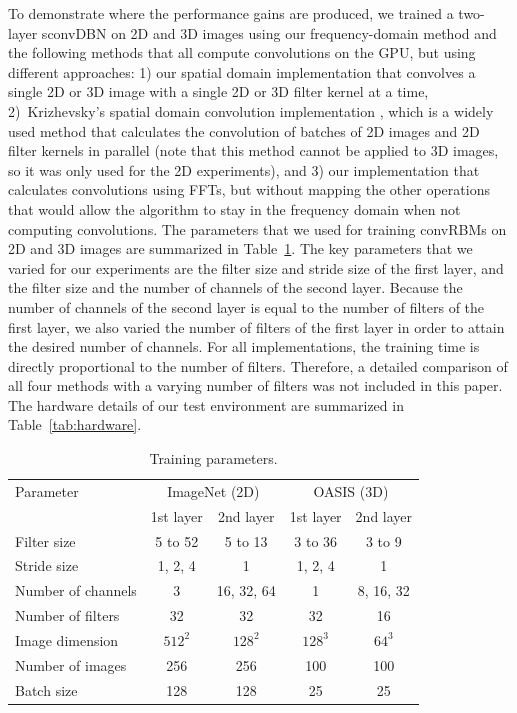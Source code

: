To demonstrate where the performance gains are produced, we trained a two-layer
sconvDBN on 2D and 3D images using our frequency-domain method and the following
methods that all compute convolutions on the GPU, but using different
approaches: 1) our spatial domain implementation that convolves a single 2D or
3D image with a single 2D or 3D filter kernel at a time, 2)~Krizhevsky's spatial
domain convolution implementation \citep{Krizhevsky2012b}, which is a widely
used method \citep[e.g.,][]{scherer2010,hinton2012,zeiler2013} that calculates
the convolution of batches of 2D images and 2D filter kernels in parallel (note
that this method cannot be applied to 3D images, so it was only used for the 2D
experiments), and 3) our implementation that calculates convolutions using FFTs,
but without mapping the other operations that would allow the algorithm to stay
in the frequency domain when not computing convolutions. The parameters that we
used for training convRBMs on 2D and 3D images are summarized in
Table~\ref{tab:parameters}. The key parameters that we varied for our
experiments are the filter size and stride size of the first layer, and the
filter size and the number of channels of the second layer.
Because the number of channels of the second layer is equal to the number of
filters of the first layer, we also varied the number of filters of the first
layer in order to attain the desired number of channels. For all
implementations, the training time is directly proportional to the number of
filters. Therefore, a detailed comparison of all four methods with a varying
number of filters was not included in this paper. The hardware details of our
test environment are summarized in Table~\ref{tab:hardware}.

\begin{table}
\centering
\caption{Training parameters.}\vspace{1em}
\begin{tabular}{lcccc}
\toprule
Parameter & \multicolumn{2}{c}{ImageNet (2D)} & \multicolumn{2}{c}{OASIS (3D)}
\\
\addlinespace
 & \multicolumn{1}{c}{1st layer} & \multicolumn{1}{c}{2nd layer} 
 & \multicolumn{1}{c}{1st layer} & \multicolumn{1}{c}{2nd layer} \\
\cmidrule(r){1-1} \cmidrule(lr){2-2} \cmidrule(lr){3-3} \cmidrule(lr){4-4}
\cmidrule(l){5-5}
Filter size & 5 to 52 & 5 to 13 & 3 to 36 & 3 to 9 \\
Stride size & 1, 2, 4 & 1 & 1, 2, 4 & 1 \\
Number of channels & 3 & 16, 32, 64 & 1 & 8, 16, 32 \\
Number of filters & 32 & 32 & 32 & 16 \\
Image dimension & $512^2$ & $128^2$ & $128^3$ & $64^3$ \\
Number of images & 256 & 256 & 100 & 100 \\
Batch size & 128 & 128 & 25 & 25 \\
\bottomrule
\end{tabular}
\label{tab:parameters}
\end{table}


